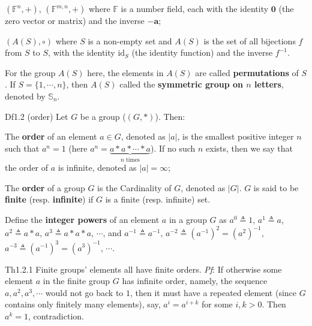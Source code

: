 \documentclass{article}
\begin{document}
\begin{Rmk}{}
\begin{compactenum}
{\begin{compactenum}
            \item $(\mathbb{F}^n, +)$, $(\mathbb{F}^{m,n}, +)$ where $\mathbb{F}$ is a number field, each with the identity $\mathbf{0}$ (the zero vector or matrix) and the inverse $-\mathbf{a}$;
            \item $(A(S), \circ)$ where $S$ is a non-empty set and $A(S)$ is the set of all bijections $f$ from $S$ to $S$, with the identity $\text{id}_S$ (the identity function) and the inverse $f^{-1}$.
        \end{compactenum}}
        \textcolor{Df}{For the group $A(S)$ here, the elements in $A(S)$ are called \textbf{permutations} of $S$. If $S = \{1, \cdots, n\}$, then $A(S)$ called the \textbf{symmetric group on $n$ letters}, denoted by $\mathbb{S}_n$.}
    \end{compactenum}
\end{Rmk}

\begin{Df}{Df1.2 (order)}
    Let $G$ be a group ($(G, \ast)$). Then:
    \begin{compactenum}
        \item The \textbf{order} of an element $a\in G$, denoted as $|a|$, is the smallest positive integer $n$ such that $a^n=1$ (here $a^n = \underbrace{a\ast a\ast \cdots \ast a}_{n\text{ times}}$). If no such $n$ exists, then we say that the order of $a$ is infinite, denoted as $|a|=\infty$;
        \item The \textbf{order} of a group $G$ is the Cardinality of $G$, denoted as $|G|$. $G$ is said to be \textbf{finite} (resp. \textbf{infinite}) if $G$ is a finite (resp. infinite) set.
    \end{compactenum}
\end{Df}

\begin{Rmk}{}
    \textcolor{Df}{Define the \textbf{integer powers} of an element $a$ in a group $G$ as $a^0\triangleq 1$, $a^1\triangleq a$, $a^2\triangleq a\ast a$, $a^3\triangleq a\ast a\ast a$, $\cdots$, and $a^{-1}\triangleq a^{-1}$, $a^{-2}\triangleq (a^{-1})^2 = (a^2)^{-1}$, $a^{-3}\triangleq (a^{-1})^3 = (a^3)^{-1}$, $\cdots$.}
\end{Rmk}

\begin{Th}{Th1.2.1}
    Finite groups' elements all have finite orders.
    \tcblower
    \textit{Pf}: If otherwise some element $a$ in the finite group $G$ has infinite order, namely, the sequence $a, a^2, a^3, \cdots$ would not go back to $1$, then it must have a repeated element (since $G$ contains only finitely many elements), say, $a^i=a^{i+k}$ for some $i, k>0$. Then $a^k = 1$, contradiction.
\end{Th}
\end{document}
